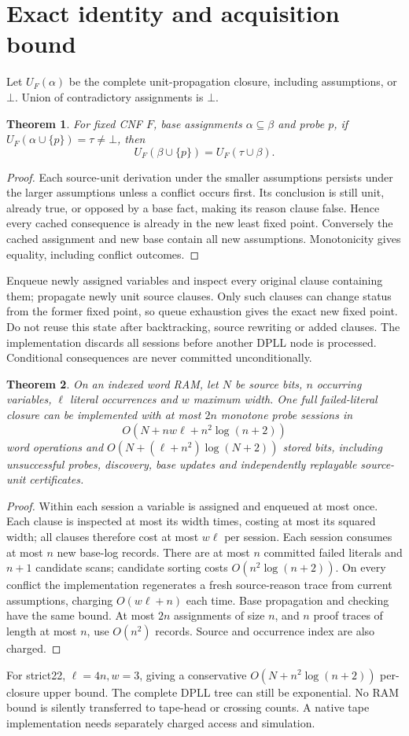 \documentclass[11pt]{article}
\newtheorem{theorem}{Theorem}
\begin{document}
\section{Exact identity and acquisition bound}
Let $U_F(\alpha)$ be the complete unit-propagation closure, including assumptions, or $\bot$. Union of contradictory assignments is $\bot$.
\begin{theorem}
For fixed CNF $F$, base assignments $\alpha\subseteq\beta$ and probe $p$, if $U_F(\alpha\cup\{p\})=\tau\ne\bot$, then
\[
U_F(\beta\cup\{p\})=U_F(\tau\cup\beta).
\]
\end{theorem}
\begin{proof}
Each source-unit derivation under the smaller assumptions persists under the larger assumptions unless a conflict occurs first. Its conclusion is still unit, already true, or opposed by a base fact, making its reason clause false. Hence every cached consequence is already in the new least fixed point. Conversely the cached assignment and new base contain all new assumptions. Monotonicity gives equality, including conflict outcomes.
\end{proof}
Enqueue newly assigned variables and inspect every original clause containing them; propagate newly unit source clauses. Only such clauses can change status from the former fixed point, so queue exhaustion gives the exact new fixed point. Do not reuse this state after backtracking, source rewriting or added clauses. The implementation discards all sessions before another DPLL node is processed. Conditional consequences are never committed unconditionally.

\begin{theorem}
On an indexed word RAM, let $N$ be source bits, $n$ occurring variables, $\ell$ literal occurrences and $w$ maximum width. One full failed-literal closure can be implemented with at most $2n$ monotone probe sessions in
\[
O(N+nw\ell+n^2\log(n+2))
\]
word operations and $O(N+(\ell+n^2)\log(N+2))$ stored bits, including unsuccessful probes, discovery, base updates and independently replayable source-unit certificates.
\end{theorem}
\begin{proof}
Within each session a variable is assigned and enqueued at most once. Each clause is inspected at most its width times, costing at most its squared width; all clauses therefore cost at most $w\ell$ per session. Each session consumes at most $n$ new base-log records. There are at most $n$ committed failed literals and $n+1$ candidate scans; candidate sorting costs $O(n^2\log(n+2))$. On every conflict the implementation regenerates a fresh source-reason trace from current assumptions, charging $O(w\ell+n)$ each time. Base propagation and checking have the same bound. At most $2n$ assignments of size $n$, and $n$ proof traces of length at most $n$, use $O(n^2)$ records. Source and occurrence index are also charged.
\end{proof}
For strict22, $\ell=4n,w=3$, giving a conservative $O(N+n^2\log(n+2))$ per-closure upper bound. The complete DPLL tree can still be exponential. No RAM bound is silently transferred to tape-head or crossing counts. A native tape implementation needs separately charged access and simulation.
\end{document}

